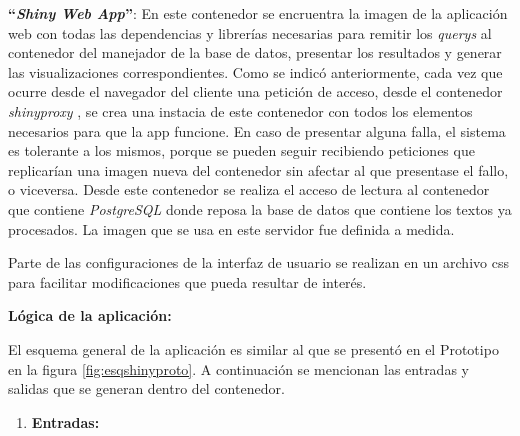 \documentclass[
  12pt,
  openany]{book}
\begin{document}
\begin{enumerate}
  \textbf{``\emph{Shiny Web App}''}: En este contenedor se encruentra la imagen de la aplicación web con todas las dependencias y librerías necesarias para remitir los \emph{querys} al contenedor del manejador de la base de datos, presentar los resultados y generar las visualizaciones correspondientes. Como se indicó anteriormente, cada vez que ocurre desde el navegador del cliente una petición de acceso, desde el contenedor \emph{shinyproxy} , se crea una instacia de este contenedor con todos los elementos necesarios para que la app funcione. En caso de presentar alguna falla, el sistema es tolerante a los mismos, porque se pueden seguir recibiendo peticiones que replicarían una imagen nueva del contenedor sin afectar al que presentase el fallo, o viceversa. Desde este contenedor se realiza el acceso de lectura al contenedor que contiene \emph{PostgreSQL} donde reposa la base de datos que contiene los textos ya procesados. La imagen que se usa en este servidor fue definida a medida.

  Parte de las configuraciones de la interfaz de usuario se realizan en un archivo css para facilitar modificaciones que pueda resultar de interés.

  \textbf{Lógica de la aplicación:}

  El esquema general de la aplicación es similar al que se presentó en el Prototipo en la figura \ref{fig:esqshinyproto}. A continuación se mencionan las entradas y salidas que se generan dentro del contenedor.

  \begin{enumerate}
  \def\labelenumii{\arabic{enumii}.}
  \item
    \textbf{Entradas:}


\end{enumerate}
\end{enumerate}
\end{document}
